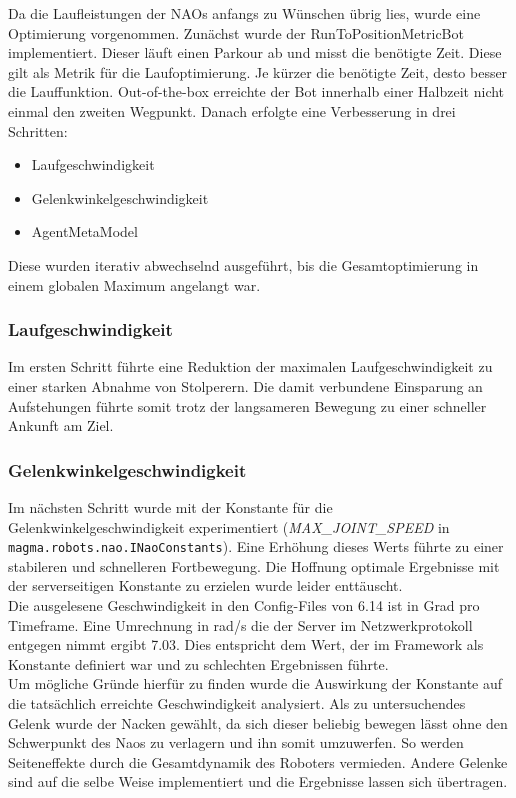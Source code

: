 Da die Laufleistungen der NAOs anfangs zu Wünschen übrig lies, wurde eine Optimierung vorgenommen. Zunächst wurde der RunToPositionMetricBot implementiert. Dieser läuft einen Parkour ab und misst die benötigte Zeit. Diese gilt als Metrik für die Laufoptimierung. Je kürzer die benötigte Zeit, desto besser die Lauffunktion.
Out-of-the-box erreichte der Bot innerhalb einer Halbzeit nicht einmal den zweiten Wegpunkt.
Danach erfolgte eine Verbesserung in drei Schritten:
\begin{itemize}
\item Laufgeschwindigkeit
\item Gelenkwinkelgeschwindigkeit
\item AgentMetaModel
\end{itemize}
Diese wurden iterativ abwechselnd ausgeführt, bis die Gesamtoptimierung in einem globalen Maximum angelangt war.

\subsubsection{Laufgeschwindigkeit}
Im ersten Schritt führte eine Reduktion der maximalen Laufgeschwindigkeit zu einer starken Abnahme von Stolperern. Die damit verbundene Einsparung an Aufstehungen führte somit trotz der langsameren Bewegung zu einer schneller Ankunft am Ziel.

\subsubsection{Gelenkwinkelgeschwindigkeit}
Im nächsten Schritt wurde mit der Konstante für die Gelenkwinkelgeschwindigkeit experimentiert (\textit{MAX\_JOINT\_SPEED} in  \texttt{magma.robots.nao.INaoConstants}). Eine Erhöhung dieses Werts führte zu einer stabileren und schnelleren Fortbewegung. Die Hoffnung optimale Ergebnisse mit der serverseitigen Konstante zu erzielen wurde leider enttäuscht.\\
Die ausgelesene Geschwindigkeit in den Config-Files von 6.14 ist in Grad pro Timeframe. Eine Umrechnung in rad/s die der Server im Netzwerkprotokoll entgegen nimmt ergibt 7.03. Dies entspricht dem Wert, der im Framework als Konstante definiert war und zu schlechten Ergebnissen führte.\\

Um mögliche Gründe hierfür zu finden wurde die Auswirkung der Konstante auf die tatsächlich erreichte Geschwindigkeit analysiert.
Als zu untersuchendes Gelenk wurde der Nacken gewählt, da sich dieser beliebig bewegen lässt ohne den Schwerpunkt des Naos zu verlagern und ihn somit umzuwerfen. So werden Seiteneffekte durch die Gesamtdynamik des Roboters vermieden. Andere Gelenke sind auf die selbe Weise implementiert und die Ergebnisse lassen sich übertragen.

